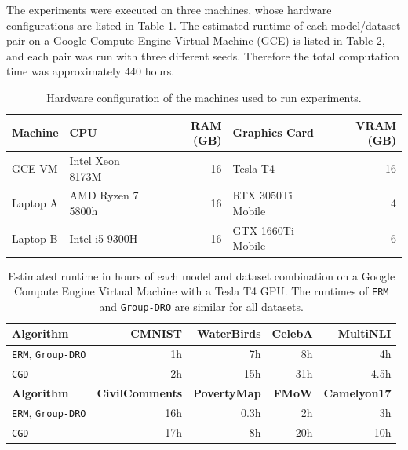 The experiments were executed on three machines, whose hardware configurations are listed in Table \ref{tab:machines}. The estimated runtime of each model/dataset pair on a Google Compute Engine Virtual Machine (GCE) is listed in Table \ref{tab:algo-runtimes}, and each pair was run with three different seeds. Therefore the total computation time was approximately 440 hours.


\begin{table}[h]
    \centering
    \begin{tabular}{llrlr}\toprule
        \textbf{Machine} & \textbf{CPU} & \textbf{RAM (GB)} & \textbf{Graphics Card} & \textbf{VRAM (GB)} \\\midrule
        GCE VM & Intel Xeon 8173M & 16 & Tesla T4  & 16\\
        Laptop A & AMD Ryzen 7 5800h & 16 & RTX 3050Ti Mobile & 4\\
        Laptop B & Intel i5‐9300H & 16 & GTX 1660Ti Mobile  & 6\\
        \bottomrule
    \end{tabular}
    \caption{Hardware configuration of the machines used to run experiments.}
    \label{tab:machines}
\end{table}

\vspace{-8pt}

\begin{table}[h]
    \centering
    \begin{tabular}{lrrrr}\toprule
        \textbf{Algorithm} & \textbf{CMNIST} & \textbf{WaterBirds} & \textbf{CelebA} & \textbf{MultiNLI} \\
        \midrule
        \texttt{ERM}, \texttt{Group-DRO} & 1h & 7h & 8h & 4h \\
        \texttt{CGD} & 2h & 15h & 31h & 4.5h \\
        \midrule
        \textbf{Algorithm} & \textbf{CivilComments} & \textbf{PovertyMap} &
        \textbf{FMoW} & \textbf{Camelyon17} \\
        \midrule
        \texttt{ERM}, \texttt{Group-DRO} & 16h & 0.3h & 2h & 3h \\
        \texttt{CGD} & 17h & 8h & 20h & 10h \\
        \bottomrule
    \end{tabular}
    \caption{Estimated runtime in hours of each model and dataset combination on a Google Compute Engine Virtual Machine with a Tesla T4 GPU. The runtimes of \texttt{ERM} and \texttt{Group-DRO} are similar for all datasets.}
    \label{tab:algo-runtimes}
\end{table}


